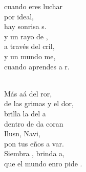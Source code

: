 \documentclass[12pt]{article}
\begin{document}
\begin{multicols*}{2}
\begin{cancion}
	cuando eres luchar\\
	por  ideal,\\
	hay  sonrisa s.\\
\jump
	y un rayo de ,\\
	a través del cril,  \\
	y un mundo me,\\
	cuando aprendes a r.\\\jump\\
	\begin{chorus}%
	Más aá del ror,\\
	de las grimas y el dor, \\
	brilla la  del a\\
	dentro de da coran\\
	Ilusn, Navi, \\
	pon tus eños a var.\\
	Siembra , brinda a,\\
	que el mundo enro pide .\\
	\end{chorus}%
	\jump\\
\end{cancion}%


\end{multicols*}
\end{document}

